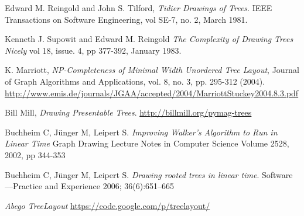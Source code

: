 \documentclass[draft]{report}
\begin{document}
\begin{thebibliography}{9}
  Edward M. Reingold and John S. Tilford,
  \emph{Tidier Drawings of Trees}.
  IEEE Transactions on Software Engineering, 
  vol SE-7, no. 2,
  March 1981.

  Kenneth J. Supowit and Edward M. Reingold
  \emph{The Complexity of Drawing Trees Nicely}
  vol 18, issue. 4, pp 377-392,
  January 1983.

  K. Marriott, 
  \emph{NP-Completeness of Minimal Width Unordered Tree Layout}, 
  Journal of Graph Algorithms and Applications, 
  vol. 8, no. 3, pp. 295-312 (2004).
  \url{http://www.emis.de/journals/JGAA/accepted/2004/MarriottStuckey2004.8.3.pdf}

  Bill Mill,
  \emph{Drawing Presentable Trees}.
  \url{http://billmill.org/pymag-trees}

  Buchheim C, J\"unger M, Leipert S. 
  \emph{Improving Walker's Algorithm to Run in Linear Time}
  Graph Drawing Lecture Notes in Computer Science Volume 2528, 
  2002, pp 344-353

  Buchheim C, J\"unger M, Leipert S. 
  \emph{Drawing rooted trees in linear time}. 
  Software—Practice and Experience 2006; 36(6):651–665

  \emph{Abego TreeLayout}
  \url{https://code.google.com/p/treelayout/}

\end{thebibliography}
\end{document}
